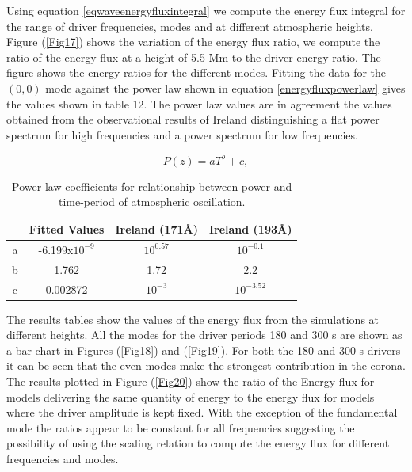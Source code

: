 \documentclass[authoryear,final,1p]{elsarticle}
\begin{document}
Using equation \eqref{eqwaveenergyfluxintegral} we compute the energy flux integral for the range of driver frequencies, modes and at different atmospheric heights. Figure (\ref{Fig17}) shows the variation of the energy flux ratio, we compute the ratio of the energy flux at a height of 5.5 Mm to the driver energy ratio.  The figure shows the energy ratios for the different modes. Fitting  the  data for the $(0,0)$ mode against the power law shown in equation \eqref{energyfluxpowerlaw} gives the values shown in table 12. The power law values are in agreement the values obtained from the observational results of Ireland \citet{Ireland2014} distinguishing a flat power spectrum for high frequencies and a power spectrum for low frequencies.

\begin{equation}
P(z)= aT^{b}+c,
\label{energyfluxpowerlaw}
\end{equation}


\begin{table}
\centering
\begin{tabular}{cccc}
\hline
   &  Fitted Values & Ireland (171{\AA}) & Ireland (193{\AA}) \\
\hline
a & -6.199x$10^{-9}$ &  $10^{0.57}$ & $10^{-0.1}$ \\
\hline
b & 1.762 & 1.72 & 2.2 \\
\hline
c & 0.002872 & $10^{-3}$ & $10^{-3.52}$ \\
\hline
\end{tabular} 
\caption{ Power law coefficients for relationship between power and time-period of atmospheric oscillation.}
\end{table}

The results tables show the values of the energy flux from the simulations at different heights. All the modes for the driver periods 180 and 300 s are shown as a bar chart in Figures (\ref{Fig18}) and (\ref{Fig19}). For both the 180 and 300 s drivers it can be seen that the even modes make the strongest contribution in the corona. The results plotted in Figure (\ref{Fig20}) show the ratio of the Energy flux for models delivering the same quantity of energy to the energy flux for models where the driver amplitude is kept fixed. With the exception of the fundamental mode the ratios appear to be constant for all frequencies suggesting the possibility of using the scaling relation to compute the energy flux for different frequencies and modes.  
\end{document}
